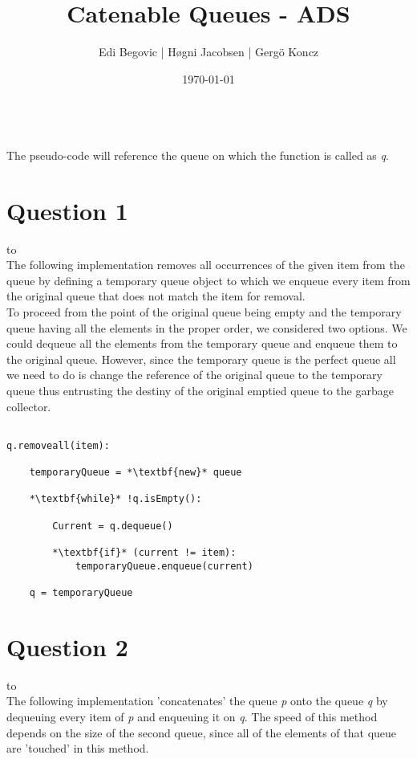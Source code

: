 \documentclass[a4paper]{article}
\title{Catenable Queues - ADS}
\author{Edi Begovic | Høgni Jacobsen | Gergö Koncz}
\date{\today}
\def\headline#1{\hbox to \hsize{\hrulefill\quad\lower.3em\hbox{#1}\quad\hrulefill}}
\begin{document}
 
\maketitle

\ \\
\noindent
The pseudo-code will reference the queue on which the function is called as \textit{q}.
\ \\
\section*{Question 1}
\headline{-} \ \\

\noindent
The following implementation removes all occurrences of the given item from the queue by defining a temporary queue
object to which we enqueue every item from the original queue that does not match the item for removal. 
\ \\

\noindent
To proceed from the point of the original queue being empty and the temporary queue having all the elements in the proper order, we considered two options. We could dequeue all the elements from the temporary queue and enqueue them to the original queue. However, since the temporary queue is the perfect queue all we need to do is change the reference of the original queue to the temporary queue thus entrusting the destiny of the original emptied queue to the garbage collector. 

\noindent
\begin{lstlisting}[escapeinside={{*}{*}}]

q.removeall(item):

    temporaryQueue = *\textbf{new}* queue

    *\textbf{while}* !q.isEmpty():

        Current = q.dequeue()
        
        *\textbf{if}* (current != item):
            temporaryQueue.enqueue(current) 
    
    q = temporaryQueue

\end{lstlisting}

\newpage
\section*{Question 2}
\headline{-} \ \\
The following implementation 'concatenates' the queue \textit{p} onto the queue \textit{q} by
dequeuing every item of \textit{p} and enqueuing it on \textit{q}. The speed of this method depends on the size of the second queue, since all of the elements of that queue are 'touched' in this method.
\ \\
\end{document}
